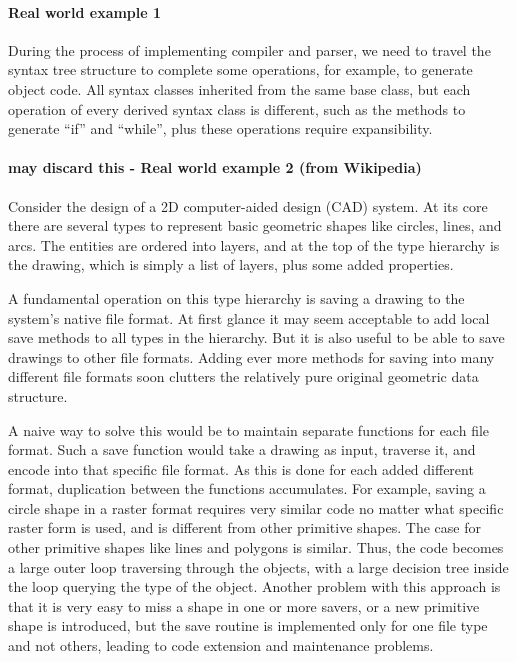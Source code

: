 \documentclass{book}
\begin{document}
\paragraph{Real world example 1}
During the process of implementing compiler and parser, we need to travel the syntax tree structure to complete some operations, for example, to generate object code. All syntax classes inherited 
from the same base class, but each operation of every derived syntax class is different, such as the methods to generate ``if'' and ``while'', plus these operations require expansibility.
\paragraph{may discard this - Real world example 2 (from Wikipedia)}
Consider the design of a 2D computer-aided design (CAD) system.
At its core there are several types to represent basic geometric shapes like circles, lines, and arcs.
The entities are ordered into layers, and at the top of the type hierarchy is the drawing, which is simply a list of layers, plus some added properties.

A fundamental operation on this type hierarchy is saving a drawing to the system's native file format.
At first glance it may seem acceptable to add local save methods to all types in the hierarchy. 
But it is also useful to be able to save drawings to other file formats. 
Adding ever more methods for saving into many different file formats soon clutters the relatively pure original geometric data structure.

A naive way to solve this would be to maintain separate functions for each file format.
Such a save function would take a drawing as input, traverse it, and encode into that specific file format.
As this is done for each added different format, duplication between the functions accumulates. 
For example, saving a circle shape in a raster format requires very similar code no matter what specific raster form is used, and is different from other primitive shapes.
The case for other primitive shapes like lines and polygons is similar. 
Thus, the code becomes a large outer loop traversing through the objects, with a large decision tree inside the loop querying the type of the object.
Another problem with this approach is that it is very easy to miss a shape in one or more savers,
or a new primitive shape is introduced, but the save routine is implemented only for one file type and not others, leading to code extension and maintenance problems.
\end{document}
